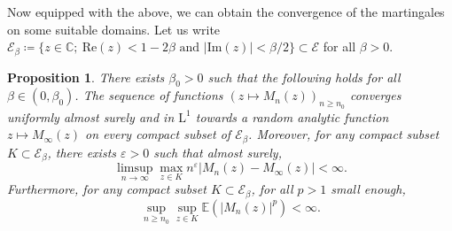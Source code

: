 \documentclass[11pt]{article}
\newtheorem{proposition}[theorem]{Proposition}
\numberwithin{equation}{section}
\def\vp{\varepsilon}
\def \C{\mathbb{C}}
\def\E{\mathbb{E}}
\renewcommand{\Re}{\mathrm{Re}}
\begin{document}
Now equipped with the above, we can obtain the convergence of the martingales on some suitable domains. Let us write $\mathcal{E}_\beta \coloneqq\{ z\in \C; \  \Re(z)<1-2\beta \text{ and } \vert \mathrm{Im}(z)\vert< \beta/2\}\subset \mathcal{E}$ for all $\beta>0$.
\begin{proposition}\label{prop cv unif martingale}
	There exists $\beta_0>0$ such that the following holds for all $\beta\in (0, \beta_0)$. The sequence of functions $(z\mapsto M_n(z))_{n\ge n_0}$ converges uniformly almost surely and in $\mathrm{L}^1$ towards a random analytic function $z \mapsto M_\infty(z)$ on every compact subset of $\mathcal{E}_\beta$. Moreover, for any compact subset $K \subset \mathcal{E}_\beta$, there exists $\vp>0$ such that almost surely,
	\[
	\limsup_{n\to \infty} \max_{z \in K} n^\vp \vert M_n(z)-M_\infty(z)\vert <\infty.
	\]
	Furthermore, for any compact subset $K \subset \mathcal{E}_\beta$, for all $p>1$ small enough,
	\begin{equation}\label{eq M n borne dans L p}
	\sup_{n\ge n_0} \sup_{z \in K} \E\left( \vert M_n (z) \vert^p \right)<\infty.
	\end{equation}
\end{proposition}
\end{document}
